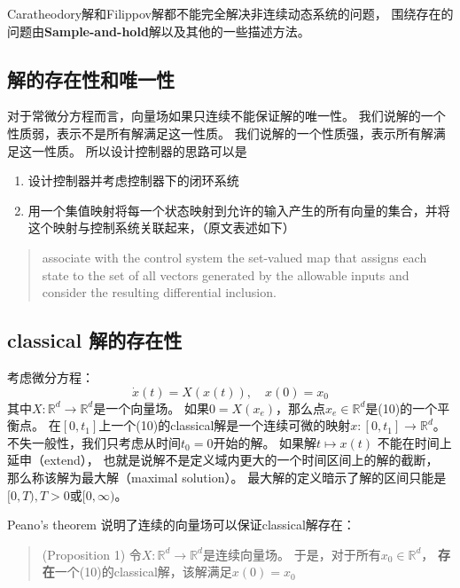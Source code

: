 Caratheodory解和Filippov解都不能完全解决非连续动态系统的问题，
围绕存在的问题由\textbf{Sample-and-hold}解以及其他的一些描述方法。

\subsection{解的存在性和唯一性}\label{ux89e3ux7684ux5b58ux5728ux6027ux548cux552fux4e00ux6027}

对于常微分方程而言，向量场如果只连续不能保证解的唯一性。
我们说解的一个性质弱，表示不是所有解满足这一性质。
我们说解的一个性质强，表示所有解满足这一性质。
所以设计控制器的思路可以是

\begin{enumerate}
\def\labelenumi{\arabic{enumi}.}

\item
  设计控制器并考虑控制器下的闭环系统
\item
  用一个集值映射将每一个状态映射到允许的输入产生的所有向量的集合，并将这个映射与控制系统关联起来，（原文表述如下）
\end{enumerate}

\begin{quote}
associate with the control system the set-valued map that assigns each
state to the set of all vectors generated by the allowable inputs and
consider the resulting differential inclusion.
\end{quote}

\subsection{classical
解的存在性}\label{classical-ux89e3ux7684ux5b58ux5728ux6027}

考虑微分方程： \[
\dot{x}(t)=X(x(t)),\quad x(0)=x_0
\tag{10}
\] 其中\(X:\mathbb{R}^d \to \mathbb{R}^d\)是一个向量场。
如果\(0=X(x_e)\)，那么点\(x_e\in \mathbb{R}^d\)是(10)的一个平衡点。
在\([0,t_1]\)上一个(10)的classical解是一个连续可微的映射\(x:[0,t_1]\to\mathbb{R}^d\)。
不失一般性，我们只考虑从时间\(t_0=0\)开始的解。 如果解\(t\mapsto x(t)\)
不能在时间上延申（extend），
也就是说解不是定义域内更大的一个时间区间上的解的截断，
那么称该解为最大解（maximal solution）。
最大解的定义暗示了解的区间只能是\([0,T),T>0\)或\([0,\infty)\)。

Peano's theorem 说明了连续的向量场可以保证classical解存在：

\begin{quote}
(Proposition 1) 令\(X:\mathbb{R}^d\to \mathbb{R}^d\)是连续向量场。
于是，对于所有\(x_0\in\mathbb{R}^d\)，
\textbf{存在}一个(10)的classical解，该解满足\(x(0)=x_0\)
\end{quote}

